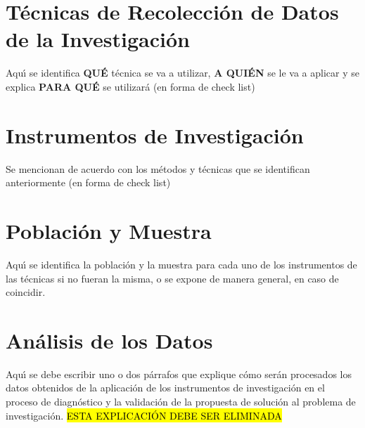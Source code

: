 \section{T\'ecnicas de Recolecci\'on de Datos de la Investigaci\'on }
\label{cap2:sec:tecnicas_de_recoleccion_de_datos_de_la_investigacion }

Aqu\'{\i} se identifica \textbf{QU\'{E}} t\'{e}cnica se va a utilizar, \textbf{A QUI\'{E}N} se le 
va a aplicar y se explica \textbf{PARA QU\'{E}} se utilizar\'{a} (en forma de check list)  



\section{Instrumentos de Investigaci\'{o}n}
\label{cap2:sec:instrumentos_de_investigacion}

Se mencionan de acuerdo con los m\'{e}todos y t\'{e}cnicas que se identifican anteriormente (en 
forma de check list) 


\section{Poblaci\'{o}n y Muestra}
\label{cap2:sec:poblacion_y_muestra}

Aqu\'{\i} se identifica la poblaci\'{o}n y la muestra para cada uno de los instrumentos de las 
t\'{e}cnicas si no fueran la misma, o se expone de manera general, en caso de coincidir.


\section{An\'alisis de los Datos}
\label{cap2:sec:analisis_de_los_datos}

Aqu\'{\i} se debe escribir uno o dos p\'{a}rrafos que explique c\'{o}mo ser\'{a}n procesados los 
datos obtenidos de la aplicaci\'{o}n de los instrumentos de investigaci\'{o}n en el proceso de 
diagn\'{o}stico y la validaci\'{o}n de la propuesta de soluci\'{o}n al problema de 
investigaci\'{o}n. \hl{ESTA EXPLICACI\'{O}N DEBE SER ELIMINADA}


